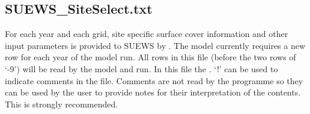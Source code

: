 \documentclass[letterpaper,10pt,english]{sphinxmanual}
\begin{document}
\subsection{SUEWS\_SiteSelect.txt}
\label{\detokenize{input_files/SUEWS_SiteInfo/SUEWS_SiteSelect::doc}}\label{\detokenize{input_files/SUEWS_SiteInfo/SUEWS_SiteSelect:suews-siteselect-txt}}\label{\detokenize{input_files/SUEWS_SiteInfo/SUEWS_SiteSelect:id1}}
For each year and each grid, site specific surface cover information and
other input parameters is provided to SUEWS by {\hyperref[\detokenize{input_files/SUEWS_SiteInfo/SUEWS_SiteSelect:suews-siteselect-txt}]{}}.
The model currently requires a new row for each year of the model run.
All rows in this file (before the two rows of ‘-9’) will be read by the
model and run. In this file the . ‘!’ can
be used to indicate comments in the file. Comments are not read by the
programme so they can be used by the user to provide notes for their
interpretation of the contents. This is strongly recommended.
\end{document}
